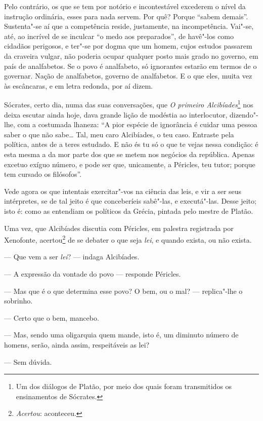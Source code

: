 Pelo contrário, os que se tem por notório e incontestável
excederem o nível da instrução ordinária, esses para nada servem. Por
quê? Porque ``sabem demais''. Sustenta"-se aí
que a competência reside, justamente, na incompetência. Vai"-se, até, ao
incrível de se inculcar ``o medo aos
preparados'', de havê"-los como cidadãos perigosos, e
ter"-se por dogma que um homem, cujos estudos passarem da craveira
vulgar, não poderia ocupar qualquer posto mais grado no governo, em
país de analfabetos. Se o povo é analfabeto, só ignorantes estarão em
termos de o governar. Nação de analfabetos, governo de analfabetos. E o
que eles, muita vez às escâncaras, e em letra redonda, por aí dizem.

Sócrates, certo dia,
numa das suas conversações, que \emph{O primeiro Alcibíades}\footnote{Um dos diálogos de Platão, por meio dos quais foram transmitidos os ensinamentos de Sócrates.} nos deixa escutar
ainda hoje, dava grande lição de modéstia ao interlocutor, dizendo"-lhe,
com a costumada lhaneza: ``A pior espécie de ignorância é
cuidar uma pessoa saber o que não sabe\ldots{} Tal, meu caro Alcibíades, o
teu caso. Entraste pela política, antes de a teres estudado. E não és
tu só o que te vejas nessa condição: é esta mesma a da mor parte dos
que se metem nos negócios da república. Apenas excetuo exíguo número, e
pode ser que, unicamente, a Péricles, teu tutor; porque tem cursado os filósofos''.

Vede agora os que intentais exercitar"-vos na ciência das leis, e
vir a ser seus intérpretes, se de tal jeito é que conceberíeis
sabê"-las, e executá"-las. Desse jeito; isto é: como as entendiam os
políticos da Grécia, pintada pelo mestre de Platão.

Uma vez, que Alcibíades discutia com Péricles, em palestra
registrada por Xenofonte, acertou\footnote{
\textit{Acertou}: aconteceu.} de se debater o que seja \textit{lei}, e
quando exista, ou não exista.

--- Que vem a ser \textit{lei}? --- indaga Alcibíades.

--- A expressão da vontade do povo --- responde
Péricles.

--- Mas que é o que determina esse povo? O bem, ou o
mal? --- replica"-lhe o sobrinho.

--- Certo que o bem, mancebo.

--- Mas, sendo uma oligarquia quem mande, isto é, um
diminuto número de homens, serão, ainda assim, respeitáveis as lei?

--- Sem dúvida.


